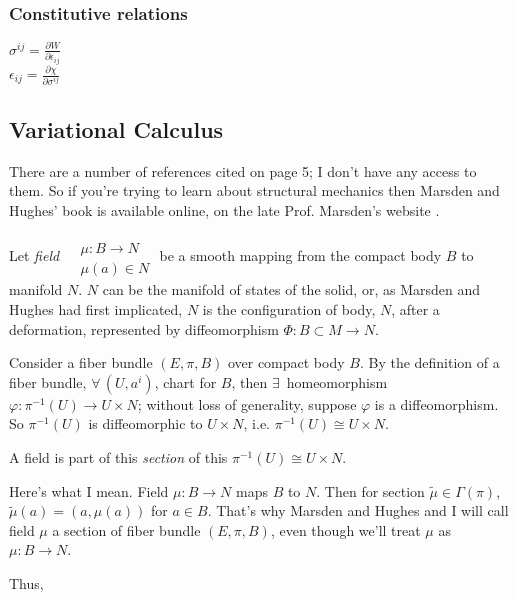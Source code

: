 \documentclass[twoside,landscape,10pt]{amsart}
\theoremstyle{plain}
\theoremstyle{definition}
\theoremstyle{remark}
\begin{document}
\begin{multicols*}{2}
\subsubsection{Constitutive relations}

$\sigma^{ij} = \frac{ \partial W}{ \partial \epsilon_{ij}}$ \\
$\epsilon_{ij} = \frac{ \partial \chi}{ \partial \sigma^{ij}}$

\subsection{Variational Calculus}



There are a number of references cited on page 5; I don't have any access to them.  So if you're trying to learn about structural mechanics then Marsden and Hughes' book is available online, on the late Prof. Marsden's website \cite{JMarsdenTHughes1994}.  

Let \emph{field} $\begin{aligned} & \quad \\
  & \mu : B \to N \\
  & \mu(a) \in N \end{aligned}$ be a smooth mapping from the compact body $B$ to manifold $N$.  $N$ can be the manifold of states of the solid, or, as Marsden and Hughes had first implicated, $N$ is the configuration of body, $N$, after a deformation, represented by diffeomorphism $\Phi : B \subset M \to N$.  

Consider a fiber bundle $(E, \pi ,B)$ over compact body $B$.  By the definition of a fiber bundle, $\forall \, (U,a^i)$, chart for $B$, then $\exists \, $ homeomorphism $\varphi : \pi^{-1}(U) \to U\times N$; without loss of generality, suppose $\varphi$ is a diffeomorphism.  So $\pi^{-1}(U)$ is diffeomorphic to $U \times N$, i.e. $\pi^{-1}(U) \cong U \times N$.    

A field is part of this \emph{section} of this $\pi^{-1}(U) \cong U \times N$.  

Here's what I mean. Field $\mu : B \to N$ maps $B$ to $N$.  Then for section $\widetilde{\mu} \in \Gamma(\pi)$, $\widetilde{\mu}(a) = (a,\mu(a))$ for $a\in B$.  That's why Marsden and Hughes \cite{JMarsdenTHughes1994} and I will call field $\mu$ a section of fiber bundle $(E,\pi,B)$, even though we'll treat $\mu$ as $\mu :B\to N$.  

Thus, 


\end{multicols*}
\end{document}

